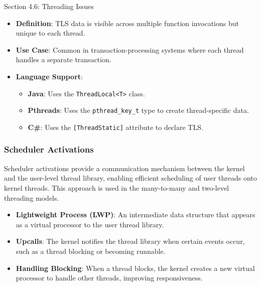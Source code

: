 \begin{notes}{Section 4.6: Threading Issues}
\begin{highlight}
        \begin{itemize}
            \item \textbf{Definition}: TLS data is visible across multiple function invocations but unique to each thread.
            \item \textbf{Use Case}: Common in transaction-processing systems where each thread handles a separate transaction.
            \item \textbf{Language Support}:
                \begin{itemize}
                    \item \textbf{Java}: Uses the \texttt{ThreadLocal<T>} class.
                    \item \textbf{Pthreads}: Uses the \texttt{pthread\_key\_t} type to create thread-specific data.
                    \item \textbf{C\#}: Uses the \texttt{[ThreadStatic]} attribute to declare TLS.
                \end{itemize}
        \end{itemize}
    
    \end{highlight}
    
    \subsubsection*{Scheduler Activations}
    
    Scheduler activations provide a communication mechanism between the kernel and the user-level thread library, enabling efficient scheduling of user threads onto kernel threads. This approach is 
    used in the many-to-many and two-level threading models.
    
    \begin{highlight}
    
        \begin{itemize}
            \item \textbf{Lightweight Process (LWP)}: An intermediate data structure that appears as a virtual processor to the user thread library.
            \item \textbf{Upcalls}: The kernel notifies the thread library when certain events occur, such as a thread blocking or becoming runnable.
            \item \textbf{Handling Blocking}: When a thread blocks, the kernel creates a new virtual processor to handle other threads, improving responsiveness.
        \end{itemize}
    

\end{highlight}
\end{notes}
